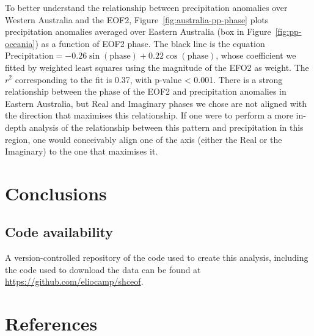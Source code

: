 \documentclass[smallextended]{svjour3}       %
\begin{document}
To better understand the relationship between precipitation anomalies over Western Australia and the EOF2, Figure~\ref{fig:australia-pp-phase} plots precipitation anomalies averaged over Eastern Australia (box in Figure~\ref{fig:pp-oceania}) as a function of EOF2 phase. The black line is the equation \(\mathrm{Precipitation} = -0.26\sin{(\mathrm{phase})} + 0.22\cos{(\mathrm{phase})}\), whose coefficient we fitted by weighted least squares using the magnitude of the EFO2 as weight. The \(r^2\) corresponding to the fit is 0.37, with p-value \textless{} 0.001. There is a strong relationship between the phase of the EOF2 and precipitation anomalies in Eastern Australia, but Real and Imaginary phases we chose are not aligned with the direction that maximises this relationship. If one were to perform a more in-depth analysis of the relationship between this pattern and precipitation in this region, one would conceivably align one of the axis (either the Real or the Imaginary) to the one that maximises it.



\hypertarget{conclusions}{%
\section{Conclusions}\label{conclusions}}

\hypertarget{code-availability}{%
\subsection*{Code availability}\label{code-availability}}

A version-controlled repository of the code used to create this analysis, including the code used to download the data can be found at \url{https://github.com/eliocamp/shceof}.

\hypertarget{references}{%
\section{References}\label{references}}




\end{document}
